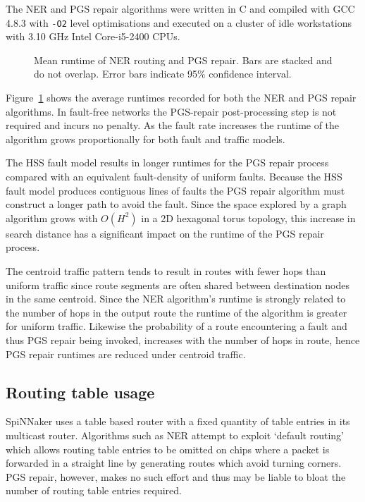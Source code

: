 			The NER and PGS repair algorithms were written in C and compiled with GCC
			4.8.3 with \verb|-O2| level optimisations and executed on a cluster of
			idle workstations with 3.10 GHz Intel Core-i5-2400 CPUs.
			
			\begin{figure}
				\center
				
				\caption{Mean runtime of NER routing and PGS repair. Bars are stacked
				and do not overlap. Error bars indicate 95\% confidence interval.}
				\label{fig:routing-runtimes}
			\end{figure}
			
			Figure~\ref{fig:routing-runtimes} shows the average runtimes recorded for
			both the NER and PGS repair algorithms. In fault-free networks the
			PGS-repair post-processing step is not required and incurs no penalty. As
			the fault rate increases the runtime of the algorithm grows
			proportionally for both fault and traffic models.
			
			The HSS fault model results in longer runtimes for the PGS repair process
			compared with an equivalent fault-density of uniform faults.  Because the
			HSS fault model produces contiguous lines of faults the PGS repair
			algorithm must construct a longer path to avoid the fault.  Since the
			space explored by a graph algorithm grows with $O(H^2)$ in a 2D hexagonal
			torus topology, this increase in search distance has a significant impact
			on the runtime of the PGS repair process.
			
			The centroid traffic pattern tends to result in routes with fewer hops
			than uniform traffic since route segments are often shared between
			destination nodes in the same centroid.  Since the NER algorithm's
			runtime is strongly related to the number of hops in the output route the
			runtime of the algorithm is greater for uniform traffic.  Likewise the
			probability of a route encountering a fault and thus PGS repair being
			invoked, increases with the number of hops in route, hence PGS repair
			runtimes are reduced under centroid traffic.
		
		\subsection{Routing table usage}
			
			SpiNNaker uses a table based router with a fixed quantity of table
			entries in its multicast router. Algorithms such as NER attempt to
			exploit `default routing' which allows routing table entries to be
			omitted on chips where a packet is forwarded in a straight line by
			generating routes which avoid turning corners.  PGS repair, however,
			makes no such effort and thus may be liable to bloat the number of
			routing table entries required.
			
